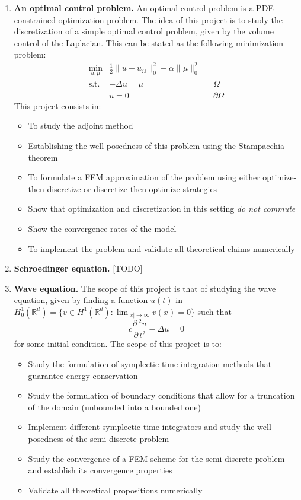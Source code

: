 \documentclass{article}
\newcommand{\R}{\mathbb{R}}
\newcommand{\parder}[2]{\frac{\partial\,#1}{\partial\,#2}}
\begin{document}
\begin{enumerate}
    \item \textbf{An optimal control problem.} An optimal control problem is a PDE-constrained optimization problem. The idea of this project is to study the discretization of a simple optimal control problem, given by the volume control of the Laplacian. This can be stated as the following minimization problem: 
        $$ \begin{aligned} \min_{u,\mu} &\frac 1 2 \|u - u_\Omega\|_0^2 + \alpha \|\mu\|_0^2 && \\
            \text{s.t.} & -\Delta u = \mu &&  \Omega \\
                        & u = 0 && \partial\Omega
        \end{aligned} $$
        This project consists in:
        \begin{itemize}
            \item To study the adjoint method
            \item Establishing the well-posedness of this problem using the Stampacchia theorem
            \item To formulate a FEM approximation of the problem using either optimize-then-discretize or discretize-then-optimize strategies
            \item Show that optimization and discretization in this setting \emph{do not commute}
            \item Show the convergence rates of the model
            \item To implement the problem and validate all theoretical claims numerically
        \end{itemize}
        
    \item \textbf{Schroedinger equation.} [TODO]
    \item \textbf{Wave equation.} The scope of this project is that of studying the wave equation, given by finding a function $u(t)$ in $H_0^1(\R^d)=\{v\in H^1(\R^d): \lim_{|x|\to \infty} v(x) = 0\}$  such that
        $$ c\parder{^2 u}{t^2} -\Delta u=0 $$
        for some initial condition. The scope of this project is to:
        \begin{itemize}
            \item Study the formulation of symplectic time integration methods that guarantee energy conservation
            \item Study the formulation of boundary conditions that allow for a truncation of the domain (unbounded into a bounded one)
            \item Implement different symplectic time integrators and study the well-posedness of the semi-discrete problem
            \item Study the convergence of a FEM scheme for the semi-discrete problem and establish its convergence properties
            \item Validate all theoretical propositions numerically
        \end{itemize}

\end{enumerate}

\end{document}
